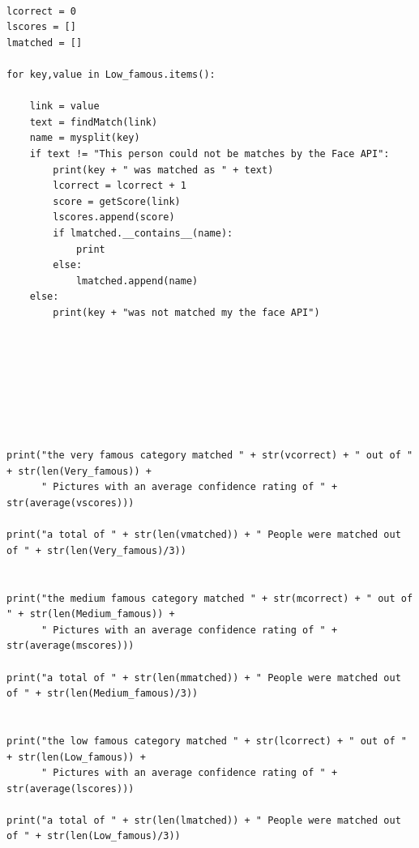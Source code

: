 \documentclass[12pt,a4paper]{article}
\begin{document}
\begin{appendices}
\begin{lstlisting}
        
lcorrect = 0 
lscores = [] 
lmatched = [] 

for key,value in Low_famous.items():
     
    link = value  
    text = findMatch(link) 
    name = mysplit(key)     
    if text != "This person could not be matches by the Face API":  
        print(key + " was matched as " + text)  
        lcorrect = lcorrect + 1  
        score = getScore(link)
        lscores.append(score) 
        if lmatched.__contains__(name): 
            print 
        else: 
            lmatched.append(name)
    else: 
        print(key + "was not matched my the face API")         
        
        
        
        
        
        

        
print("the very famous category matched " + str(vcorrect) + " out of " + str(len(Very_famous)) + 
      " Pictures with an average confidence rating of " + str(average(vscores)))  

print("a total of " + str(len(vmatched)) + " People were matched out of " + str(len(Very_famous)/3))  


print("the medium famous category matched " + str(mcorrect) + " out of " + str(len(Medium_famous)) + 
      " Pictures with an average confidence rating of " + str(average(mscores)))  

print("a total of " + str(len(mmatched)) + " People were matched out of " + str(len(Medium_famous)/3))  


print("the low famous category matched " + str(lcorrect) + " out of " + str(len(Low_famous)) + 
      " Pictures with an average confidence rating of " + str(average(lscores)))   

print("a total of " + str(len(lmatched)) + " People were matched out of " + str(len(Low_famous)/3))
\end{lstlisting}

\end{appendices}
\end{document}
